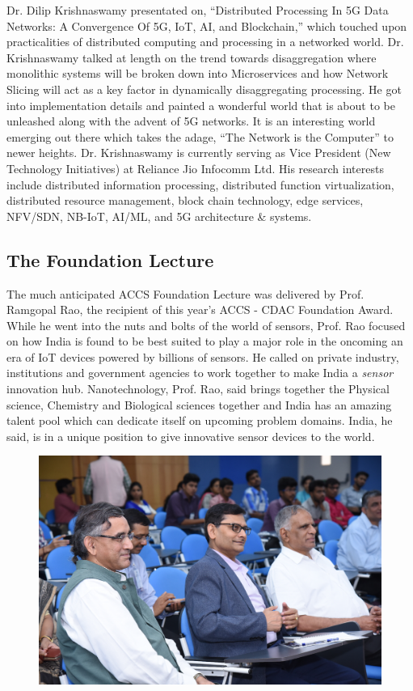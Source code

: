 \begin{multicols}{2}
Dr. Dilip Krishnaswamy presentated on, “Distributed Processing In 5G Data Networks: A Convergence Of 5G, IoT, AI, and Blockchain,” which touched upon practicalities of distributed computing and processing in a networked world. Dr. Krishnaswamy talked at length on the trend towards disaggregation where monolithic systems will be broken down into Microservices and how Network Slicing will act as a key factor in dynamically disaggregating processing. He got into implementation details and painted a wonderful world that is about to be unleashed along with the advent of 5G networks. It is an interesting world emerging out there which takes the adage, “The Network is the Computer” to newer heights.  Dr. Krishnaswamy is currently serving as Vice President (New Technology Initiatives) at Reliance Jio Infocomm Ltd. His research interests include distributed information processing, distributed function virtualization, distributed resource management, block chain technology, edge services, NFV/SDN, NB-IoT, AI/ML, and 5G architecture \& systems. 

\subsection*{The Foundation Lecture}

The much anticipated ACCS Foundation Lecture was delivered by Prof. Ramgopal Rao, the recipient of this year’s ACCS - CDAC Foundation Award. While he went into the nuts and bolts of the world of sensors, Prof. Rao focused on how India is found to be best suited to play a major role in the oncoming an era of IoT devices powered by billions of sensors. He called on private industry, institutions and government agencies to work together to make India a \textit{sensor} innovation hub. Nanotechnology, Prof. Rao, said brings together the Physical science, Chemistry and Biological sciences together and India has an amazing talent pool which can dedicate itself on upcoming problem domains. India, he said, is in a unique position to give innovative sensor devices to the world.

\setcounter{figure}{0}
\begin{figure}[H]
\centering
\includegraphics[scale=.75]{src/Figures/events/event-fig02.jpg}
\vspace{-4ex}
\end{figure}


\end{multicols}
